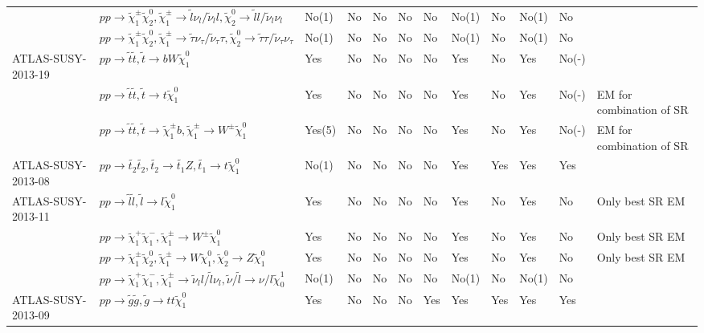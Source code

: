 \documentclass[11pt,A4paper]{article}
\begin{document}
\begin{landscape}
\begin{longtable} {|l|l|l|l|l|l|l|l|l|l|l|l|}
 & $pp \rightarrow \tilde{\chi}_1 ^{\pm} \tilde{\chi}_2 ^0 , \tilde{\chi}_1 ^{\pm} \rightarrow \tilde{l} \nu_{l}  / \tilde{\nu}_{l} l , \tilde{\chi}_2 ^0 \rightarrow \tilde{l} l   / \tilde{\nu}_{l} \nu_{l}$ & No(1) & No & No & No & No & No(1) & No & No(1) & No & \\
  & $pp \rightarrow \tilde{\chi}_1 ^{\pm} \tilde{\chi}_2 ^0 , \tilde{\chi}_1 ^{\pm} \rightarrow \tilde{\tau} \nu_{\tau} / \tilde{\nu}_{\tau} \tau , \tilde{\chi}_2 ^0 \rightarrow \tilde{\tau} \tau  / \tilde{\nu}_{\tau}  \nu_{\tau}$ & No(1) & No & No & No & No & No(1) & No & No(1) & No & \\ \hline
ATLAS-SUSY-2013-19 & $pp \rightarrow \tilde{t} \tilde{t}, \tilde{t}\rightarrow b W \tilde{\chi}_1 ^0 $ & Yes & No & No & No & No & Yes & No & Yes & No(-) & \\
 & $pp \rightarrow \tilde{t} \tilde{t}, \tilde{t}\rightarrow t  \tilde{\chi}_1 ^0 $ & Yes & No & No & No & No & Yes & No & Yes & No(-) & EM for combination of SR\\
  & $pp \rightarrow \tilde{t} \tilde{t}, \tilde{t}\rightarrow \tilde{\chi}_1 ^{\pm} b,\tilde{\chi}_1 ^{\pm} \rightarrow W^{\pm} \tilde{\chi}_1 ^0$ & Yes(5) & No & No & No & No & Yes & No & Yes & No(-) & EM for combination of SR\\ \hline
ATLAS-SUSY-2013-08 & $pp \rightarrow \tilde{t_2} \tilde{t_2}, \tilde{t_2}\rightarrow \tilde{t_1} Z , \tilde{t_1} \rightarrow t \tilde{\chi}_1 ^0$ & No(1) & No & No & No & No & Yes & Yes & Yes & Yes & \\ \hline
ATLAS-SUSY-2013-11 & $pp \rightarrow \tilde{l} \tilde{l}, \tilde{l}\rightarrow l \tilde{\chi}_1 ^0$ & Yes & No & No & No & No & Yes & No & Yes & No & Only best SR EM\\
 & $pp \rightarrow \tilde{\chi}_1 ^{+} \tilde{\chi}_1 ^{-} , \tilde{\chi}_1 ^{\pm} \rightarrow W^{\pm} \tilde{\chi}_1 ^0 $ & Yes & No & No & No & No & Yes & No & Yes & No & Only best SR EM\\
 & $pp \rightarrow \tilde{\chi}_1 ^{\pm} \tilde{\chi}_2 ^0 , \tilde{\chi}_1 ^{\pm} \rightarrow W \tilde{\chi}_1 ^0 , \tilde{\chi}_2 ^0 \rightarrow Z \tilde{\chi}_1 ^0$ & Yes & No & No & No & No & Yes & No & Yes & No & Only best SR EM\\
  & $pp \rightarrow \tilde{\chi}_1 ^{+} \tilde{\chi}_1 ^{-} , \tilde{\chi}_1 ^{\pm}  \rightarrow \tilde{\nu}_{l} l / \tilde{l}  \nu_{l},  \tilde{\nu}/ \tilde{l} \rightarrow \nu / l \tilde{\chi}_0 ^1 $ & No(1) & No & No & No & No & No(1) & No & No(1) & No & \\ \hline
ATLAS-SUSY-2013-09 & $pp \rightarrow \tilde{g} \tilde{g}, \tilde{g}\rightarrow t  t  \tilde{\chi}_1 ^0 $ & Yes & No & No & No & Yes & Yes & Yes & Yes & Yes & \\

\end{longtable}
\end{landscape}
\end{document}
